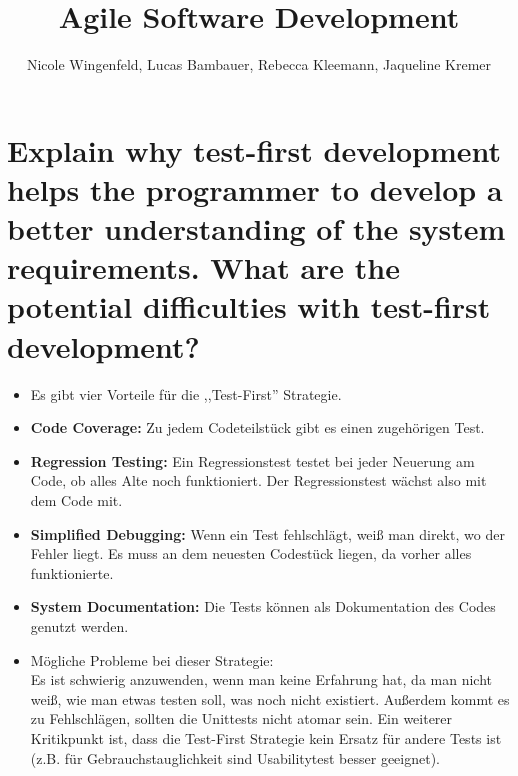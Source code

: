 \documentclass[a4paper,10pt]{article}
\title{Agile Software Development}
\author{Nicole Wingenfeld, Lucas Bambauer, Rebecca Kleemann, Jaqueline Kremer}
\begin{document}
\maketitle



\section*{Explain why test-first development helps the programmer to develop a better understanding of the system requirements. What are the potential difficulties with test-first development?}
\begin{itemize}
 \item[] Es gibt vier Vorteile für die ,,Test-First'' Strategie. 
 \item [] \textbf{Code Coverage:} Zu jedem Codeteilstück gibt es einen zugehörigen Test.
 \item[]\textbf{Regression Testing:}  Ein Regressionstest testet bei jeder Neuerung am Code, ob alles Alte noch funktioniert. Der Regressionstest wächst also mit dem Code mit. 
 \item[] \textbf{Simplified Debugging:} Wenn ein Test fehlschlägt, weiß man direkt, wo der Fehler liegt. Es muss an dem neuesten Codestück liegen, da vorher alles funktionierte. 
 \item[] \textbf{System Documentation:} Die Tests können als Dokumentation des Codes genutzt werden. 
 \item[]Mögliche Probleme bei dieser Strategie: \\ Es ist schwierig anzuwenden, wenn man keine Erfahrung hat, da man nicht weiß, wie man etwas testen soll, was noch nicht existiert. Außerdem kommt es zu Fehlschlägen, sollten die Unittests nicht atomar sein. Ein weiterer Kritikpunkt ist, dass die Test-First Strategie kein Ersatz für andere Tests ist (z.B. für Gebrauchstauglichkeit sind Usabilitytest besser geeignet).
\end{itemize}
\end{document}
